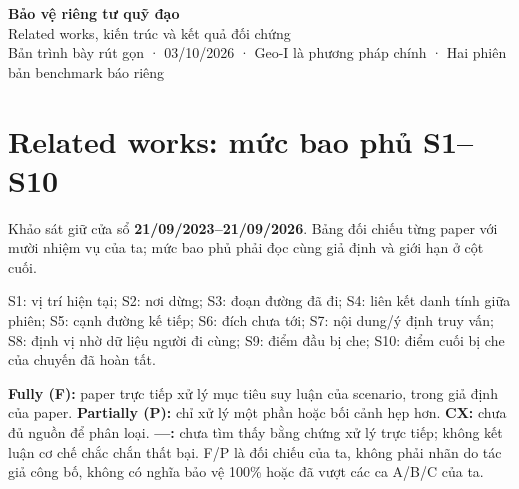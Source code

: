 \documentclass[10pt,a4paper]{article}
\begin{document}
\begin{center}{\LARGE\bfseries\color{ink}Bảo vệ riêng tư quỹ đạo}\\[5pt]{\large Related works, kiến trúc và kết quả đối chứng}\\[4pt]{\small Bản trình bày rút gọn · 03/10/2026 · Geo-I là phương pháp chính · Hai phiên bản benchmark báo riêng}\end{center}
\section{Related works: mức bao phủ S1–S10}\label{sec:1}
Khảo sát giữ cửa sổ \textbf{21/09/2023–21/09/2026}. Bảng đối chiếu từng paper với mười nhiệm vụ của ta; mức bao phủ phải đọc cùng giả định và giới hạn ở cột cuối.

S1: vị trí hiện tại; S2: nơi dừng; S3: đoạn đường đã đi; S4: liên kết danh tính giữa phiên; S5: cạnh đường kế tiếp; S6: đích chưa tới; S7: nội dung/ý định truy vấn; S8: định vị nhờ dữ liệu người đi cùng; S9: điểm đầu bị che; S10: điểm cuối bị che của chuyến đã hoàn tất.

\textbf{Fully (F):} paper trực tiếp xử lý mục tiêu suy luận của scenario, trong giả định của paper. \textbf{Partially (P):} chỉ xử lý một phần hoặc bối cảnh hẹp hơn. \textbf{CX:} chưa đủ nguồn để phân loại. \textbf{—:} chưa tìm thấy bằng chứng xử lý trực tiếp; không kết luận cơ chế chắc chắn thất bại. F/P là đối chiếu của ta, không phải nhãn do tác giả công bố, không có nghĩa bảo vệ 100\% hoặc đã vượt các ca A/B/C của ta.
\end{document}
